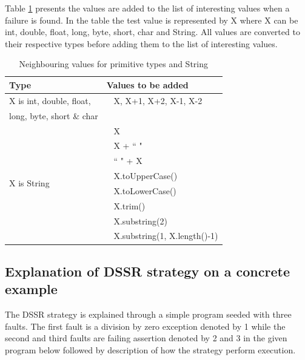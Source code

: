 Table \ref{table:addvalues2} presents the values are added to the list of interesting values when a failure is found. In the table the test value is represented by X where X can be int, double, float, long, byte, short, char and String. All values are converted to their respective types before adding them to the list of interesting values.

\begin{table}[ht]
\caption{Neighbouring values for primitive types and String} %
\smallskip
\centering %
\begin{tabular}{| l | l |} %
\hline\hline %
Type & Values to be added\\ [0.5ex] %
\hline %
\multirow{1}{*}{X is int, double, float, } & ~ X,  X+1, X+2, X-1, X-2 \\ %
\multirow{1}{*}{long, byte, short \& char} &  \\ 

\hline
\multirow{8}{*}{X is String} & ~ X\\ %

& ~ X + ``  "\\ %
& ~ ``  " + X \\ %
& ~ X.toUpperCase() \\
& ~ X.toLowerCase() \\
& ~ X.trim() \\
& ~ X.substring(2) \\
& ~ X.substring(1, X.length()-1) \\[1ex]
\hline
\hline %
\end{tabular}
\bigskip
\label{table:addvalues2} %
\end{table}







\subsection{Explanation of DSSR strategy on a concrete example}
The DSSR strategy is explained through a simple program seeded with three faults. The first fault is a division by zero exception denoted by 1 while the second and third faults are failing assertion denoted by 2 and 3 in the given program below followed by description of how the strategy perform execution.

